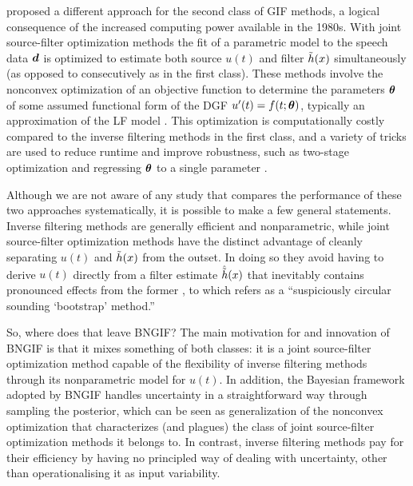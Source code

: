 \begin{chaptersections}
\cite{Milenkovic1986} proposed a different approach for the second class of GIF methods, a logical consequence of the increased computing power available in the 1980s.
With joint source-filter optimization methods the fit of a parametric model to the speech data ${\bm d}$ is optimized to estimate both source $u(t)$ and filter $\tilde{h}(x)$ simultaneously (as opposed to consecutively as in the first class).
These methods involve the nonconvex optimization of an objective function to determine the parameters ${\bm \theta}$ of some assumed functional form of the DGF $u'(t) = f(t;{\bm \theta})$, typically an approximation of the LF model \citep[for example,][]{Fu2006,Degottex2010,Alzamendi2017,Schleusing2012}.
This optimization is computationally costly compared to the inverse filtering methods in the first class, and a variety of tricks are used to reduce runtime and improve robustness, such as two-stage optimization \citep{Fu2006} and regressing ${\bm \theta}$ to a single parameter \citep{Degottex2010}.

Although we are not aware of any study that compares the performance of these two approaches systematically, it is possible to make a few general statements.
Inverse filtering methods are generally efficient and nonparametric, while joint source-filter optimization methods have the distinct advantage of cleanly separating $u(t)$ and $\tilde{h}(x)$ from the outset.
In doing so they avoid having to derive $u(t)$ directly from a filter estimate $\hat{\tilde{h}}(x)$ that inevitably contains pronounced effects from the former \citep{Auvinen2014}, to which \cite[][p.~94]{Schroeder1999} refers as a ``suspiciously circular sounding `bootstrap' method.''

So, where does that leave BNGIF?
The main motivation for and innovation of BNGIF is that it mixes something of both classes: it is a joint source-filter optimization method capable of the flexibility of inverse filtering methods through its nonparametric model for $u(t)$.
In addition, the Bayesian framework adopted by BNGIF handles uncertainty in a straightforward way through sampling the posterior, which can be seen as generalization of the nonconvex optimization that characterizes (and plagues) the class of joint source-filter optimization methods it belongs to.
In contrast, inverse filtering methods pay for their efficiency by having no principled way of dealing with uncertainty, other than operationalising it as input variability.


\end{chaptersections}
